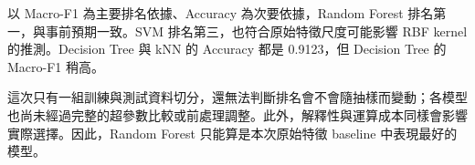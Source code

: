 以 Macro-F1 為主要排名依據、Accuracy 為次要依據，Random Forest 排名第一，與事前預期一致。SVM 排名第三，也符合原始特徵尺度可能影響 RBF kernel 的推測。Decision Tree 與 kNN 的 Accuracy 都是 0.9123，但 Decision Tree 的 Macro-F1 稍高。

這次只有一組訓練與測試資料切分，還無法判斷排名會不會隨抽樣而變動；各模型也尚未經過完整的超參數比較或前處理調整。此外，解釋性與運算成本同樣會影響實際選擇。因此，Random Forest 只能算是本次原始特徵 baseline 中表現最好的模型。

